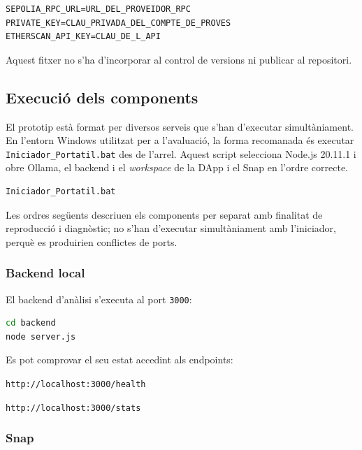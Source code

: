 \begin{lstlisting}
SEPOLIA_RPC_URL=URL_DEL_PROVEIDOR_RPC
PRIVATE_KEY=CLAU_PRIVADA_DEL_COMPTE_DE_PROVES
ETHERSCAN_API_KEY=CLAU_DE_L_API
\end{lstlisting}

Aquest fitxer no s’ha d’incorporar al control de versions ni publicar al repositori.

\subsection{Execució dels components}

El prototip està format per diversos serveis que s’han d’executar simultàniament. En l'entorn Windows utilitzat per a l'avaluació, la forma recomanada és executar \texttt{Iniciador\_Portatil.bat} des de l'arrel. Aquest script selecciona Node.js 20.11.1 i obre Ollama, el backend i el \textit{workspace} de la DApp i el Snap en l'ordre correcte.

\begin{lstlisting}[language=bash]
Iniciador_Portatil.bat
\end{lstlisting}

Les ordres següents descriuen els components per separat amb finalitat de reproducció i diagnòstic; no s'han d'executar simultàniament amb l'iniciador, perquè es produirien conflictes de ports.

\subsubsection{Backend local}

El backend d’anàlisi s’executa al port \texttt{3000}:

\begin{lstlisting}[language=bash]
cd backend
node server.js
\end{lstlisting}

Es pot comprovar el seu estat accedint als endpoints:

\begin{center}
\texttt{http://localhost:3000/health}
\end{center}

\begin{center}
\texttt{http://localhost:3000/stats}
\end{center}

\subsubsection{Snap}

